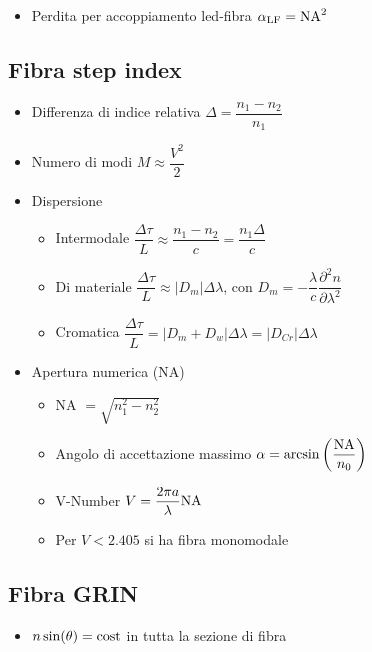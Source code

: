 \documentclass[9pt]{extarticle}
\begin{document}
\begin{itemize}
  \item Perdita per accoppiamento led-fibra \( \alpha_{\textnormal{LF}} = \textnormal{NA} ^ 2 \)
\end{itemize}
\subsection{Fibra step index}
\begin{itemize}
  \item Differenza di indice relativa \(  \Delta = \dfrac{n_1 - n_2}{n_1} \)
  \item Numero di modi \(  M \approx \dfrac{V^2}{2} \)
  \item Dispersione
        \begin{itemize}
          \item Intermodale \(  \dfrac{\Delta \tau}{L} \approx \dfrac{n_1 - n_2}{c} = \dfrac{n_1 \Delta}{c} \)
          \item Di materiale \(  \dfrac{\Delta \tau}{L} \approx | D_m | \Delta \lambda \), con \( D_m =  -\dfrac{\lambda}{c} \dfrac{\partial ^ 2 n}{\partial \lambda ^ 2} \)
          \item Cromatica \( \dfrac{\Delta \tau}{L} = | D_m + D_w | \Delta \lambda = | D_{Cr} | \Delta \lambda \)
        \end{itemize}
  \item Apertura numerica (NA)
        \begin{itemize}
          \item NA \( \displaystyle = \sqrt{n_1^2 - n_2^2} \)
          \item Angolo di accettazione massimo \( \alpha = \arcsin \left( \dfrac{\textnormal{NA}}{n_0} \right) \)
          \item V-Number \( V = \dfrac{2 \pi a}{\lambda} \textnormal{NA} \)
          \item Per \( V < 2.405 \) si ha fibra monomodale
        \end{itemize}
\end{itemize}

\subsection{Fibra GRIN}
\begin{itemize}
  \item \( n \sin(\theta) = \textnormal{cost} \) in tutta la sezione di fibra
\end{itemize}
\end{document}
